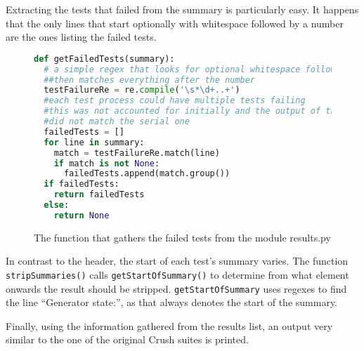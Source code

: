 Extracting the tests that failed from the summary is particularly easy. It happens that the only lines that start optionally with whitespace followed by a number are the ones listing the failed tests.

\begin{figure}[h]
\begin{lstlisting}[language=Python]
def getFailedTests(summary):
  # a simple regex that looks for optional whitespace followed by a number
  ##then matches everything after the number
  testFailureRe = re.compile('\s*\d+..+')
  #each test process could have multiple tests failing 
  #this was not accounted for initially and the output of the parallel Testu01
  #did not match the serial one
  failedTests = []
  for line in summary:
    match = testFailureRe.match(line)
    if match is not None:
      failedTests.append(match.group())
  if failedTests:
    return failedTests
  else:
    return None       
\end{lstlisting}
\caption{The function that gathers the failed tests from the module results.py}
\label{fig:getFailedTests}
\end{figure}

In contrast to the header, the start of each test's summary varies. The function \texttt{stripSummaries()} calls \texttt{getStartOfSummary()} to determine from what element onwards the result should be stripped. \texttt{getStartOfSummary} uses regexes to find the line ``Generator state:'', as that always denotes the start of the summary.

Finally, using the information gathered from the results list, an output very similar to the one of the original Crush suites is printed.
